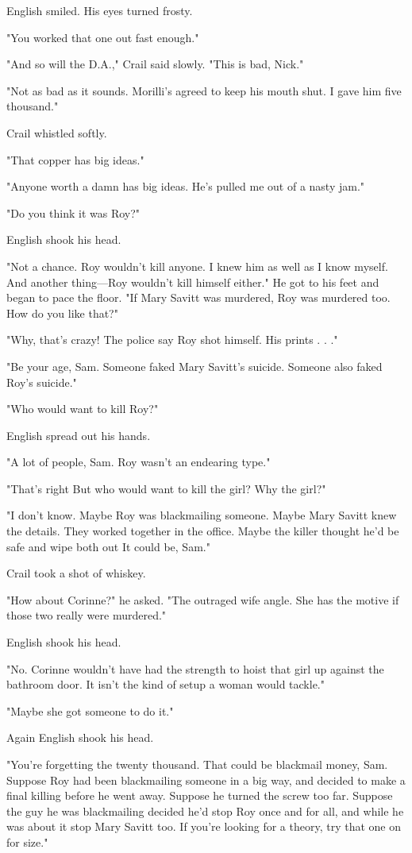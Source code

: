 \documentclass{novel}
\begin{document}
English smiled. His eyes turned frosty.

"You worked that one out fast enough."

"And so will the D.A.," Crail said slowly. "This is bad, Nick."

"Not as bad as it sounds. Morilli's agreed to keep his mouth shut. I gave him five thousand."

Crail whistled softly.

"That copper has big ideas."

"Anyone worth a damn has big ideas. He's pulled me out of a nasty jam."

"Do you think it was Roy?"

English shook his head.

"Not a chance. Roy wouldn't kill anyone. I knew him as well as I know myself. And another thing—Roy wouldn't kill himself either." He got to his feet and began to pace the floor. "If Mary Savitt was murdered, Roy was murdered too. How do you like that?"

"Why, that's crazy! The police say Roy shot himself. His prints . . ."

"Be your age, Sam. Someone faked Mary Savitt's suicide. Someone also faked Roy's suicide."

"Who would want to kill Roy?"

English spread out his hands.

"A lot of people, Sam. Roy wasn't an endearing type."

"That's right But who would want to kill the girl? Why the girl?"

"I don't know. Maybe Roy was blackmailing someone. Maybe Mary Savitt knew the details. They worked together in the office. Maybe the killer thought he'd be safe and wipe both out It could be, Sam."

Crail took a shot of whiskey.

"How about Corinne?" he asked. "The outraged wife angle. She has the motive if those two really were murdered."

English shook his head.

"No. Corinne wouldn't have had the strength to hoist that girl up against the bathroom door. It isn't the kind of setup a woman would tackle."

"Maybe she got someone to do it."

Again English shook his head.

"You're forgetting the twenty thousand. That could be blackmail money, Sam. Suppose Roy had been blackmailing someone in a big way, and decided to make a final killing before he went away. Suppose he turned the screw too far. Suppose the guy he was blackmailing decided he'd stop Roy once and for all, and while he was about it stop Mary Savitt too. If you're looking for a theory, try that one on for size."
\end{document}
